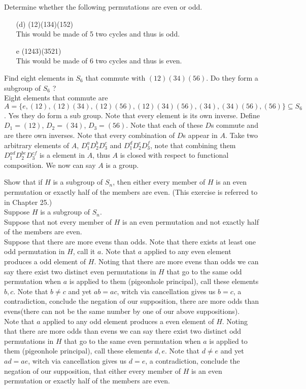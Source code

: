 \documentclass[12pt]{article}
\makeatletter
\theoremstyle{homework}
\newenvironment{exercise}[1]
{\def\@currentlabel{#1}\exercisecore}
{\endexercisecore}
\makeatother
\begin{document}
\begin{exercise}{5.11}
Determine whether the following permutations are even or odd.
\begin{enumerate}[(a)]
\item[(d)]
(12)(134)(152)\\
This would be made of 5 two cycles and thus is odd.
\item[e]
(1243)(3521)\\
This would be made of 6 two cycles and thus is even.
\end{enumerate}
\end{exercise}

\begin{exercise}{5.14}
Find eight elements in $S_6$ that commute with $(12)(34)(56)$. Do they form a subgroup of $S_6$ ?\\
Eight elements that commute are $A=\{e,(12),(12)(34),(12)(56),(12)(34)(56),(34),(34)(56),(56)\}\subseteq S_6$.  Yes they do form a sub group.  Note that every element is its own inverse.  Define $D_1=(12)$, $D_2=(34)$, $D_3=(56)$.  Note that each of these $D$s commute and are there own inverses.  Note that every combination of $D$s appear in $A$.  Take two arbitrary elements of $A$, $D_1^aD_2^bD_3^c$ and $D_1^dD_2^eD_3^f$, note that combining them $D_1^{ad}D_2^{be}D_3^{cf}$ is a element in $A$, thus $A$ is closed with respect to functional composition.  We now can say $A$ is a group.
\end{exercise}

\begin{exercise}{5.23}
Show that if $H$ is a subgroup of $S_n$, then either every member of $H$ is an even permutation or exactly half of the members are even.  (This exercise is referred to in Chapter 25.)\\
Suppose $H$ is a subgroup of $S_n$.\\
Suppose that not every member of $H$ is an even permutation and not exactly half of the members are even.\\
Suppose that there are more evens than odds.  Note that there exists at least one odd permutation in $H$, call it $a$.  Note that $a$ applied to any even element produces a odd element of $H$.  Noting that there are more evens than odds we can say there exist two distinct even permutations in $H$ that go to the same odd permutation when $a$ is applied to them (pigeonhole principal), call these elements $b,c$.  Note that $b\neq c$ and yet $ab=ac$, witch via cancellation gives us $b=c$, a contradiction, conclude the negation of our supposition, there are more odds than evens(there can not be the same number by one of our above suppositions).\\
Note that $a$ applied to any odd element produces a even element of $H$.  Noting that there are more odds than evens we can say there exist two distinct odd permutations in $H$ that go to the same even permutation when $a$ is applied to them (pigeonhole principal), call these elements $d,e$.  Note that $d\neq e$ and yet $ad=ae$, witch via cancellation gives us $d=e$, a contradiction, conclude the negation of our supposition, that either every member of $H$ is an even permutation or exactly half of the members are even.
\end{exercise}
\end{document}
